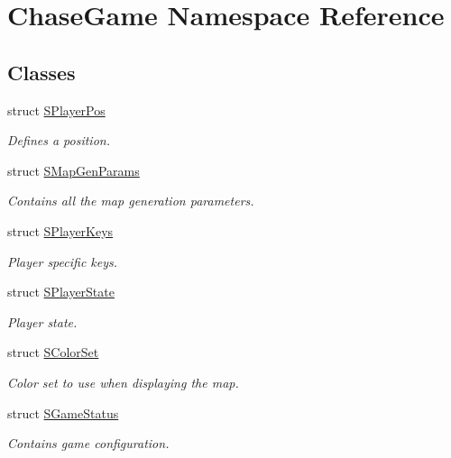 \hypertarget{namespace_chase_game}{\section{Chase\-Game Namespace Reference}
\label{namespace_chase_game}
}
\subsection*{Classes}
\begin{DoxyCompactItemize}
\item 
struct \hyperlink{struct_chase_game_1_1_s_player_pos}{S\-Player\-Pos}
\begin{DoxyCompactList}\small\item\em Defines a position. \end{DoxyCompactList}\item 
struct \hyperlink{struct_chase_game_1_1_s_map_gen_params}{S\-Map\-Gen\-Params}
\begin{DoxyCompactList}\small\item\em Contains all the map generation parameters. \end{DoxyCompactList}\item 
struct \hyperlink{struct_chase_game_1_1_s_player_keys}{S\-Player\-Keys}
\begin{DoxyCompactList}\small\item\em Player specific keys. \end{DoxyCompactList}\item 
struct \hyperlink{struct_chase_game_1_1_s_player_state}{S\-Player\-State}
\begin{DoxyCompactList}\small\item\em Player state. \end{DoxyCompactList}\item 
struct \hyperlink{struct_chase_game_1_1_s_color_set}{S\-Color\-Set}
\begin{DoxyCompactList}\small\item\em Color set to use when displaying the map. \end{DoxyCompactList}\item 
struct \hyperlink{struct_chase_game_1_1_s_game_status}{S\-Game\-Status}
\begin{DoxyCompactList}\small\item\em Contains game configuration. \end{DoxyCompactList}\end{DoxyCompactItemize}
